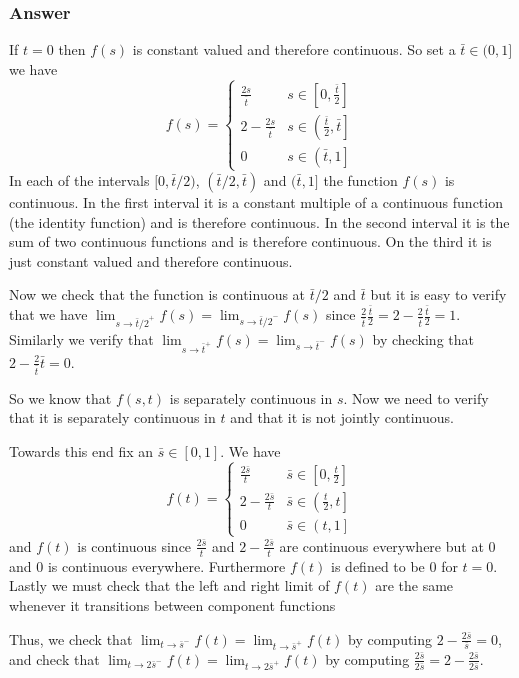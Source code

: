 \documentclass[12pt]{article}
\begin{document}
\subsubsection{Answer}
If $t=0$ then $f(s)$ is constant valued and therefore continuous. So set a $\bar{t} \in (0,1]$ we have \[f(s)= \left\{ \begin{array} {cr} \frac{2s}{\bar{t}} & s \in \left[ 0, \frac{\bar{t}}{2} \right] \\ 2-\frac{2 s}{\bar{t}} & s \in \left( \frac{\bar{t}}{2} ,\bar{ t} \right] \\ 0 & s \in \left( \bar{t}, 1 \right] \end{array} \right.\]
In each of the intervals $[0,\bar{t}/2)$, $(\bar{t}/2,\bar{t})$ and $(\bar{t},1]$ the function $f(s)$ is continuous. In the first interval it is a constant multiple of a continuous function (the identity function) and is therefore continuous. In the second interval it is the sum of two continuous functions and is therefore continuous. On the third it is just constant valued and therefore continuous. 

Now we check that the function is continuous at $\bar{t}/2$ and $\bar{t}$ but it is easy to verify that we have $\lim_{{s\to\bar{t}/2}^+}f(s)=\lim_{{s\to\bar{t}/2}^-}f(s)$ since $\frac{2}{\bar{t}} \frac{\bar{t}}{2}= 2- \frac{2}{\bar{t}} \frac{\bar{t}}{2}=1$. Similarly we verify that $\lim_{{s\to\bar{t}}^+}f(s)=\lim_{{s\to\bar{t}}^-}f(s)$ by checking that $2- \frac{2}{\bar{t}}\bar{t}=0$.

So we know that $f(s,t)$ is separately continuous in $s$. Now we need to verify that it is separately continuous in $t$ and that it is not jointly continuous. 

Towards this end fix an $\bar{s} \in [0,1]$. We have 
\[f(t)= \left\{ \begin{array} {cr} \frac{2\bar{s}}{t} & \bar{s} \in \left[ 0, \frac{t}{2} \right] \\ 2-\frac{2 \bar{s}}{t} & \bar{s} \in \left( \frac{t}{2} , t \right] \\ 0 & \bar{s} \in \left( t, 1 \right] \end{array} \right.\]
and $f(t)$ is continuous since $\frac{2\bar{s}}{t}$ and $2-\frac{2 \bar{s}}{t}$ are continuous everywhere but at $0$ and $0$ is continuous everywhere. Furthermore $f(t)$ is defined to be $0$ for $t=0$. Lastly we must check that the left and right limit of $f(t)$ are the same whenever it transitions between component functions

Thus, we check that $\lim _{t \to \bar{s}^-}f(t) = \lim _{t \to \bar{s}^+}f(t)$ by computing $2-\frac{2\bar{s}}{\bar{s}}=0$, and check that 
 $\lim _{t \to 2\bar{s}^-}f(t) = \lim _{t \to 2\bar{s}^+}f(t)$ by computing $\frac{2 \bar{s}}{2 \bar{s}}= 2- \frac{2 \bar{s}}{2 \bar{s}}$.
 
\end{document}

